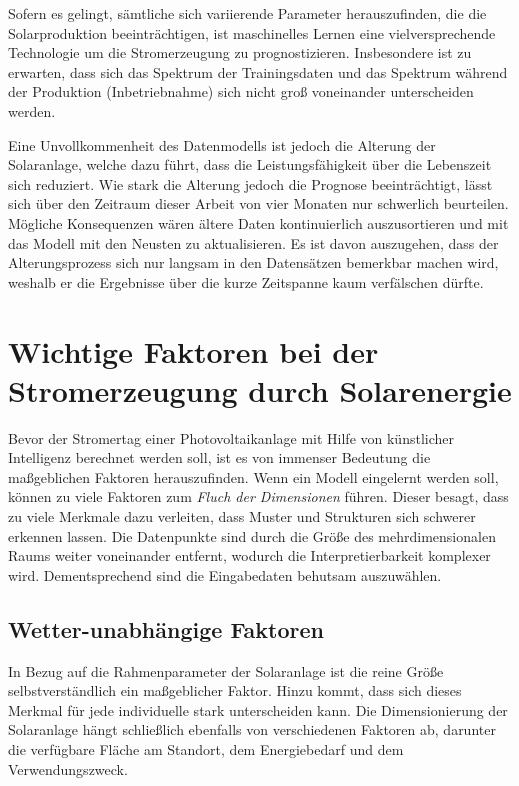 \documentclass[12pt, a4paper]{article}
\begin{document}
Sofern es gelingt, sämtliche sich variierende Parameter herauszufinden, die die Solarproduktion beeinträchtigen, ist maschinelles Lernen eine vielversprechende Technologie um die Stromerzeugung zu prognostizieren. Insbesondere ist zu erwarten, dass sich das Spektrum der Trainingsdaten und das Spektrum während der Produktion (Inbetriebnahme) sich nicht groß voneinander unterscheiden werden.

Eine Unvollkommenheit des Datenmodells ist jedoch die Alterung der Solaranlage, welche dazu führt, dass die Leistungsfähigkeit über die Lebenszeit sich reduziert. Wie stark die Alterung jedoch die Prognose beeinträchtigt, lässt sich über den Zeitraum dieser Arbeit von vier Monaten nur schwerlich beurteilen. Mögliche Konsequenzen wären ältere Daten kontinuierlich auszusortieren und mit das Modell mit den Neusten zu aktualisieren. Es ist davon auszugehen, dass der Alterungsprozess sich nur langsam in den Datensätzen bemerkbar machen wird, weshalb er die Ergebnisse über die kurze Zeitspanne kaum verfälschen dürfte.


\newpage

\section{Wichtige Faktoren bei der Stromerzeugung durch Solarenergie}

Bevor der Stromertag einer Photovoltaikanlage mit Hilfe von künstlicher Intelligenz berechnet werden soll, ist es von immenser Bedeutung die maßgeblichen Faktoren herauszufinden. Wenn ein Modell eingelernt werden soll, können zu viele Faktoren zum \textit{Fluch der Dimensionen} führen. Dieser besagt, dass zu viele Merkmale dazu verleiten, dass Muster und Strukturen sich schwerer erkennen lassen. Die Datenpunkte sind durch die Größe des mehrdimensionalen Raums weiter voneinander entfernt, wodurch die Interpretierbarkeit komplexer wird. Dementsprechend sind die Eingabedaten behutsam auszuwählen.


\subsection{Wetter-unabhängige Faktoren}

In Bezug auf die Rahmenparameter der Solaranlage ist die reine Größe selbstverständlich ein maßgeblicher Faktor. Hinzu kommt, dass sich dieses Merkmal für jede individuelle stark unterscheiden kann. Die Dimensionierung der Solaranlage hängt schließlich ebenfalls von verschiedenen Faktoren ab, darunter die verfügbare Fläche am Standort, dem Energiebedarf und dem Verwendungszweck.
\end{document}

